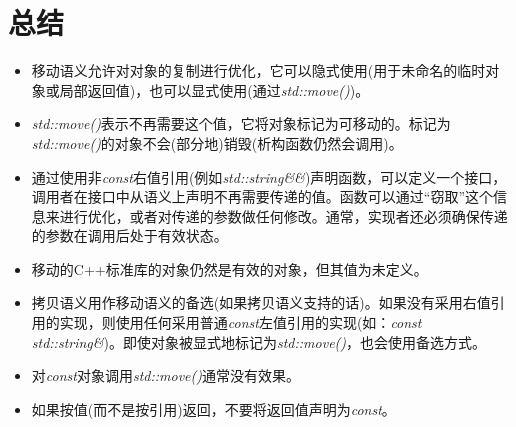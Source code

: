 \section{总结}
\begin{itemize}
	\item 移动语义允许对对象的复制进行优化，它可以隐式使用(用于未命名的临时对象或局部返回值)，也可以显式使用(通过\textit{std::move()})。
	\item \textit{std::move()}表示不再需要这个值，它将对象标记为可移动的。标记为\textit{std::move()}的对象不会(部分地)销毁(析构函数仍然会调用)。
	\item 通过使用非\textit{const}右值引用(例如\textit{std::string\&\&})声明函数，可以定义一个接口，调用者在接口中从语义上声明不再需要传递的值。函数可以通过“窃取”这个信息来进行优化，或者对传递的参数做任何修改。通常，实现者还必须确保传递的参数在调用后处于有效状态。
	\item 移动的C++标准库的对象仍然是有效的对象，但其值为未定义。
	\item 拷贝语义用作移动语义的备选(如果拷贝语义支持的话)。如果没有采用右值引用的实现，则使用任何采用普通\textit{const}左值引用的实现(如：\textit{const std::string\&})。即使对象被显式地标记为\textit{std::move()}，也会使用备选方式。
	\item 对\textit{const}对象调用\textit{std::move()}通常没有效果。
	\item 如果按值(而不是按引用)返回，不要将返回值声明为\textit{const}。
\end{itemize}

